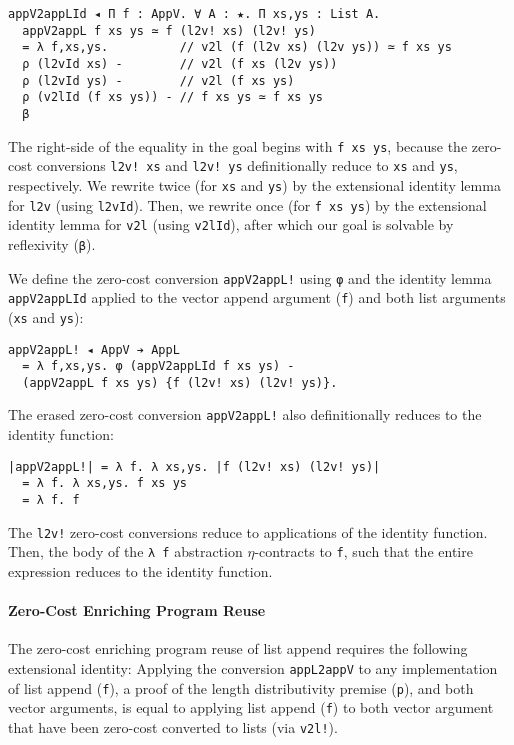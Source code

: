 \documentclass[acmsmall]{acmart}\settopmatter{}
\begin{document}
\begin{verbatim}
appV2appLId ◂ Π f : AppV. ∀ A : ★. Π xs,ys : List A. 
  appV2appL f xs ys ≃ f (l2v! xs) (l2v! ys)
  = λ f,xs,ys.          // v2l (f (l2v xs) (l2v ys)) ≃ f xs ys
  ρ (l2vId xs) -        // v2l (f xs (l2v ys))
  ρ (l2vId ys) -        // v2l (f xs ys)
  ρ (v2lId (f xs ys)) - // f xs ys ≃ f xs ys
  β
\end{verbatim}
The right-side of the equality in the goal begins with
\verb;f xs ys;, because the zero-cost conversions \verb;l2v! xs; and
\verb;l2v! ys; definitionally reduce to \verb;xs; and \verb;ys;,
respectively. We rewrite twice (for \verb;xs; and \verb;ys;)
by the extensional identity lemma for \verb;l2v; (using \verb;l2vId;).
Then, we rewrite once (for \verb;f xs ys;) by the extensional identity
lemma for \verb;v2l; (using \verb;v2lId;), after which our goal is
solvable by reflexivity (\verb;β;).

We define the zero-cost conversion \verb;appV2appL!; using \verb;φ; and
the identity lemma \verb;appV2appLId; applied to the vector append
argument (\verb;f;) and both list arguments (\verb;xs; and \verb;ys;):

\begin{verbatim}
appV2appL! ◂ AppV ➔ AppL
  = λ f,xs,ys. φ (appV2appLId f xs ys) - 
  (appV2appL f xs ys) {f (l2v! xs) (l2v! ys)}.
\end{verbatim}
The erased zero-cost conversion \verb;appV2appL!; also definitionally
reduces to the identity function:

\begin{verbatim}
|appV2appL!| = λ f. λ xs,ys. |f (l2v! xs) (l2v! ys)|
  = λ f. λ xs,ys. f xs ys 
  = λ f. f
\end{verbatim}
The \verb;l2v!; zero-cost conversions reduce to applications of the
identity function. Then, the body of the \verb;λ f; abstraction
$\eta$-contracts to \verb;f;, such that the entire expression reduces
to the identity function.

\paragraph{Zero-Cost Enriching Program Reuse}

The zero-cost enriching program reuse of list append requires
the following extensional identity:
Applying the conversion \verb;appL2appV; to any implementation of
list append (\verb;f;), a proof of the length distributivity premise (\verb;p;),
and both vector arguments, is equal
to applying list append (\verb;f;) to both vector argument that have been
zero-cost converted to lists (via \verb;v2l!;).
\end{document}
